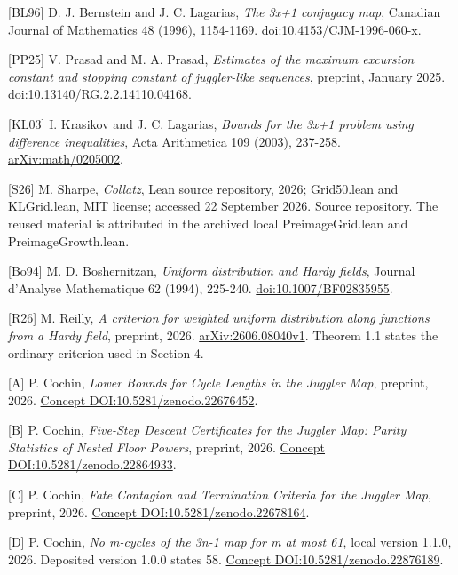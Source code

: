 \documentclass[11pt,a4paper]{article}
\begin{document}
{[}BL96{]} D. J. Bernstein and J. C. Lagarias, \emph{The 3x+1 conjugacy
map}, Canadian Journal of Mathematics 48 (1996), 1154-1169.
\href{https://doi.org/10.4153/CJM-1996-060-x}{doi:10.4153/CJM-1996-060-x}.

{[}PP25{]} V. Prasad and M. A. Prasad, \emph{Estimates of the maximum
excursion constant and stopping constant of juggler-like sequences},
preprint, January 2025.
\href{https://doi.org/10.13140/RG.2.2.14110.04168}{doi:10.13140/RG.2.2.14110.04168}.

{[}KL03{]} I. Krasikov and J. C. Lagarias, \emph{Bounds for the 3x+1
problem using difference inequalities}, Acta Arithmetica 109 (2003),
237-258. \href{https://arxiv.org/abs/math/0205002}{arXiv:math/0205002}.

{[}S26{]} M. Sharpe, \emph{Collatz}, Lean source repository, 2026;
Grid50.lean and KLGrid.lean, MIT license; accessed 22 September 2026.
\href{https://github.com/msharpe248/collatz}{Source repository}. The
reused material is attributed in the archived local PreimageGrid.lean
and PreimageGrowth.lean.

{[}Bo94{]} M. D. Boshernitzan, \emph{Uniform distribution and Hardy
fields}, Journal d'Analyse Mathematique 62 (1994), 225-240.
\href{https://doi.org/10.1007/BF02835955}{doi:10.1007/BF02835955}.

{[}R26{]} M. Reilly, \emph{A criterion for weighted uniform distribution
along functions from a Hardy field}, preprint, 2026.
\href{https://arxiv.org/abs/2606.08040v1}{arXiv:2606.08040v1}. Theorem
1.1 states the ordinary criterion used in Section 4.

{[}A{]} P. Cochin, \emph{Lower Bounds for Cycle Lengths in the Juggler
Map}, preprint, 2026.
\href{https://doi.org/10.5281/zenodo.22676452}{Concept
DOI:10.5281/zenodo.22676452}.

{[}B{]} P. Cochin, \emph{Five-Step Descent Certificates for the Juggler
Map: Parity Statistics of Nested Floor Powers}, preprint, 2026.
\href{https://doi.org/10.5281/zenodo.22864933}{Concept
DOI:10.5281/zenodo.22864933}.

{[}C{]} P. Cochin, \emph{Fate Contagion and Termination Criteria for the
Juggler Map}, preprint, 2026.
\href{https://doi.org/10.5281/zenodo.22678164}{Concept
DOI:10.5281/zenodo.22678164}.

{[}D{]} P. Cochin, \emph{No m-cycles of the 3n-1 map for m at most 61},
local version 1.1.0, 2026. Deposited version 1.0.0 states 58.
\href{https://doi.org/10.5281/zenodo.22876189}{Concept
DOI:10.5281/zenodo.22876189}.

\endgroup
\end{document}
